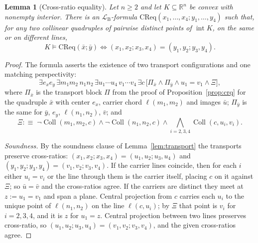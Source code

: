 \documentclass[11pt]{amsart}
\newtheorem{lemma}[theorem]{Lemma}
\theoremstyle{definition}
\newcommand{\R}{\mathbb{R}}
\newcommand{\LB}{\mathcal{L}_{\mathrm{B}}}
\newcommand{\Coll}{\operatorname{Coll}}
\newcommand{\interior}{\operatorname{int}}
\begin{document}
\begin{lemma}[Cross-ratio equality]\label{lem:creq}
Let $n\ge2$ and let $K\subseteq\R^n$ be convex with nonempty interior. There
is an $\LB$-formula $\mathrm{CReq}(x_1,\dots,x_4;y_1,\dots,y_4)$ such that,
for any two collinear quadruples of pairwise distinct points of
$\interior K$, on the same or on different lines,
\[
K\models\mathrm{CReq}(\bar x;\bar y)\iff
(x_1,x_2;x_3,x_4)=(y_1,y_2;y_3,y_4).
\]
\end{lemma}

\begin{proof}
The formula asserts the existence of two transport configurations and one
matching perspectivity:
\[
\exists e_x e_y\,\exists m_1m_2\,n_1n_2\,
\exists u_1\cdots u_4\,v_1\cdots v_4\,\exists c\,
\bigl[\Pi_{\bar x}\wedge\Pi_{\bar y}\wedge u_1=v_1\wedge\Xi\bigr],
\]
where $\Pi_{\bar x}$ is the transport block $\Pi$ from the proof of
Proposition~\ref{prop:crq} for the quadruple $\bar x$ with center $e_x$,
carrier chord $\ell(m_1,m_2)$ and images $\bar u$; $\Pi_{\bar y}$ is the same
for $\bar y$, $e_y$, $\ell(n_1,n_2)$, $\bar v$; and
\[
\Xi:\equiv\;\neg\Coll(m_1,m_2,c)\wedge\neg\Coll(n_1,n_2,c)\wedge
\textstyle\bigwedge_{i=2,3,4}\Coll(c,u_i,v_i).
\]

\emph{Soundness.} By the soundness clause of Lemma~\ref{lem:transport} the
transports preserve cross-ratios:
$(x_1,x_2;x_3,x_4)=(u_1,u_2;u_3,u_4)$ and
$(y_1,y_2;y_3,y_4)=(v_1,v_2;v_3,v_4)$. If the carrier lines coincide, then
for each $i$ either $u_i=v_i$ or the line through them is the carrier itself,
placing $c$ on it against $\Xi$; so $\bar u=\bar v$ and the cross-ratios
agree. If the carriers are distinct they meet at $z:=u_1=v_1$ and span a
plane. Central projection from $c$ carries each $u_i$ to the unique point of
$\ell(n_1,n_2)$ on the line $\ell(c,u_i)$; by $\Xi$ that point is $v_i$ for
$i=2,3,4$, and it is $z$ for $u_1=z$. Central projection between two lines
preserves cross-ratio, so
$(u_1,u_2;u_3,u_4)=(v_1,v_2;v_3,v_4)$, and the given cross-ratios agree.


\end{proof}
\end{document}
